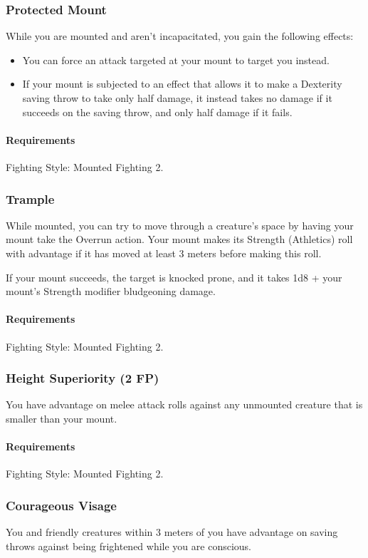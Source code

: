 \subsubsection{Protected Mount} \label{feat::protectedmount}
    While you are mounted and aren't incapacitated, you gain the following effects:
    \begin{itemize}
        \item You can force an attack targeted at your mount to target you instead.
        \item If your mount is subjected to an effect that allows it to make a Dexterity saving throw to take only half damage, it instead takes no damage if it succeeds on the saving throw, and only half damage if it fails.
    \end{itemize}
    \paragraph{Requirements} Fighting Style: Mounted Fighting 2.
\subsubsection{Trample} \label{feat::trample}
    While mounted, you can try to move through a creature's space by having your mount take the Overrun action.
    Your mount makes its Strength (Athletics) roll with advantage if it has moved at least 3 meters before making this roll.

    If your mount succeeds, the target is knocked prone, and it takes 1d8 + your mount's Strength modifier bludgeoning damage.
    \paragraph{Requirements} Fighting Style: Mounted Fighting 2.
\subsubsection{Height Superiority (2 FP)} \label{feat::heightsuperiority}
    You have advantage on melee attack rolls against any unmounted creature that is smaller than your mount.
    \paragraph{Requirements} Fighting Style: Mounted Fighting 2.
\subsubsection{Courageous Visage} \label{feat::courageousvisage}
    You and friendly creatures within 3 meters of you have advantage on saving throws against being frightened while you are conscious.
